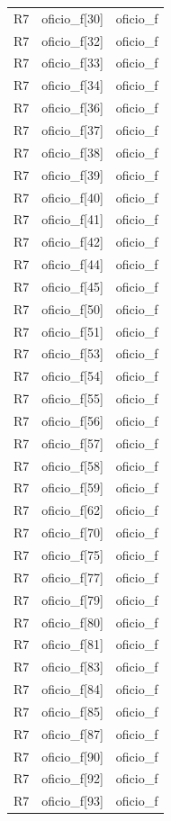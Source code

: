 \begin{longtable}{lll}
R7 & oficio\_f[30] & oficio\_f \\
R7 & oficio\_f[32] & oficio\_f \\
R7 & oficio\_f[33] & oficio\_f \\
R7 & oficio\_f[34] & oficio\_f \\
R7 & oficio\_f[36] & oficio\_f \\
R7 & oficio\_f[37] & oficio\_f \\
R7 & oficio\_f[38] & oficio\_f \\
R7 & oficio\_f[39] & oficio\_f \\
R7 & oficio\_f[40] & oficio\_f \\
R7 & oficio\_f[41] & oficio\_f \\
R7 & oficio\_f[42] & oficio\_f \\
R7 & oficio\_f[44] & oficio\_f \\
R7 & oficio\_f[45] & oficio\_f \\
R7 & oficio\_f[50] & oficio\_f \\
R7 & oficio\_f[51] & oficio\_f \\
R7 & oficio\_f[53] & oficio\_f \\
R7 & oficio\_f[54] & oficio\_f \\
R7 & oficio\_f[55] & oficio\_f \\
R7 & oficio\_f[56] & oficio\_f \\
R7 & oficio\_f[57] & oficio\_f \\
R7 & oficio\_f[58] & oficio\_f \\
R7 & oficio\_f[59] & oficio\_f \\
R7 & oficio\_f[62] & oficio\_f \\
R7 & oficio\_f[70] & oficio\_f \\
R7 & oficio\_f[75] & oficio\_f \\
R7 & oficio\_f[77] & oficio\_f \\
R7 & oficio\_f[79] & oficio\_f \\
R7 & oficio\_f[80] & oficio\_f \\
R7 & oficio\_f[81] & oficio\_f \\
R7 & oficio\_f[83] & oficio\_f \\
R7 & oficio\_f[84] & oficio\_f \\
R7 & oficio\_f[85] & oficio\_f \\
R7 & oficio\_f[87] & oficio\_f \\
R7 & oficio\_f[90] & oficio\_f \\
R7 & oficio\_f[92] & oficio\_f \\
R7 & oficio\_f[93] & oficio\_f \\

\end{longtable}
